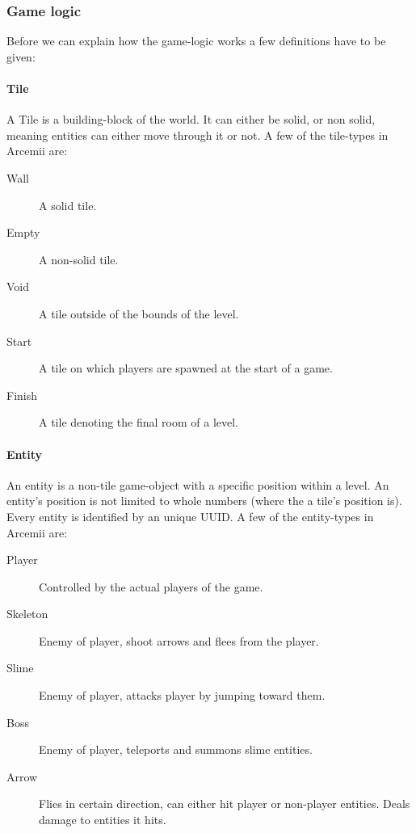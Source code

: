 \documentclass[../main.tex]{subfiles}
\begin{document}
        
        \subsubsection{Game logic}\label{sec: game logic}
        Before we can explain how the game-logic works a few definitions have to be given:

        \paragraph{Tile} A Tile is a building-block of the world. It can either be solid, or non solid, meaning entities can either move through it or not. A few of the tile-types in Arcemii are:
        \begin{description}
            \item[Wall] A solid tile.
            \item[Empty] A non-solid tile.
            \item[Void] A tile outside of the bounds of the level.
            \item[Start] A tile on which players are spawned at the start of a game.
            \item[Finish] A tile denoting the final room of a level.
        \end{description}

        \paragraph{Entity} An entity is a non-tile game-object with a specific position within a level. An entity's position is not limited to whole numbers (where the a tile's position is). Every entity is identified by an unique UUID. A few of the entity-types in Arcemii are:
        \begin{description}
            \item[Player] Controlled by the actual players of the game.
            \item[Skeleton] Enemy of player, shoot arrows and flees from the player.
            \item[Slime] Enemy of player, attacks player by jumping toward them.
            \item[Boss] Enemy of player, teleports and summons slime entities.
            \item[Arrow] Flies in certain direction, can either hit player or non-player entities. Deals damage to entities it hits.
        \end{description}
\end{document}
